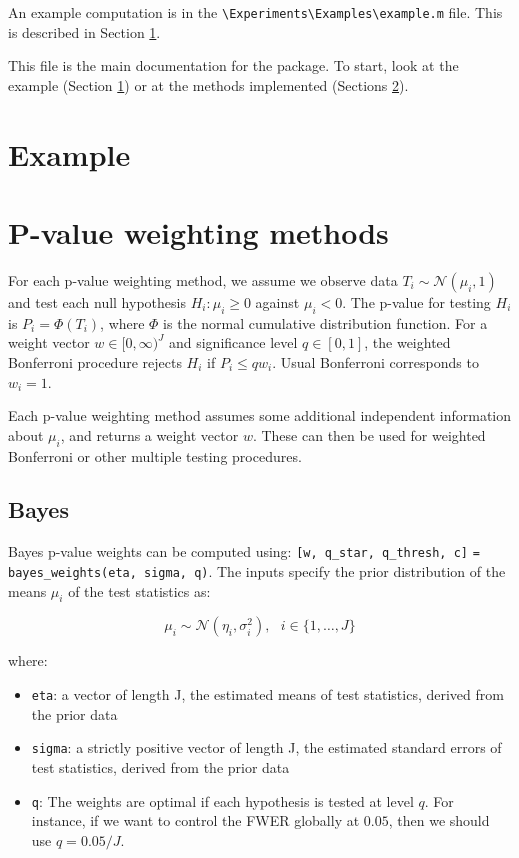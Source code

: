 \documentclass[english,11pt]{article} %
\begin{document}
An example computation is in the \verb+\Experiments\Examples\example.m+ file. This is described in Section \ref{example}.

This file is the main documentation for the package. To start, look at the example (Section \ref{example}) or at the methods implemented (Sections \ref{methods}).

\section{Example}
\label{example}

\section{P-value weighting methods}
\label{methods}

For each p-value weighting method, we assume we observe data $T_i \sim \mathcal{N}(\mu_i, 1)$ and test each null hypothesis $H_i: \mu_i \ge 0$ against $\mu_i <0$.  The p-value for testing $H_i$ is $P_i = \Phi(T_i)$, where $\Phi$ is the normal cumulative distribution function.  For a weight vector $w \in [0,\infty)^{J}$ and significance level $q \in [0,1]$, the weighted Bonferroni procedure rejects $H_{i}$ if $P_i \le q w_i$. Usual Bonferroni corresponds to $w_i=1$.

Each p-value weighting method assumes some additional independent information about $\mu_i$, and returns a weight vector $w$. These can then be used for weighted Bonferroni or other multiple testing procedures.

\subsection{Bayes}


Bayes p-value weights can be computed using:  \verb+[w, q_star, q_thresh, c]+ \verb+= bayes_weights(eta, sigma, q)+. The inputs specify the prior distribution of the means $\mu_i $ of the test statistics as:

$$\mu_i \sim \mathcal{N}(\eta_i,\sigma_i^2), \mbox{   } i \in \{1,\ldots, J\}$$ 

where:

\begin{itemize}
\item \verb+eta+:  a vector of length J, the estimated means of test statistics, derived from the prior data
\item \verb+sigma+:  a strictly positive vector of length J, the estimated standard errors of test statistics, derived from the prior data
\item \verb+q+: The weights are optimal if each hypothesis is tested at level $q$. For instance, if we want to control the FWER globally at $0.05$, then we should use $q = 0.05/J$.
\end{itemize}
\end{document}
